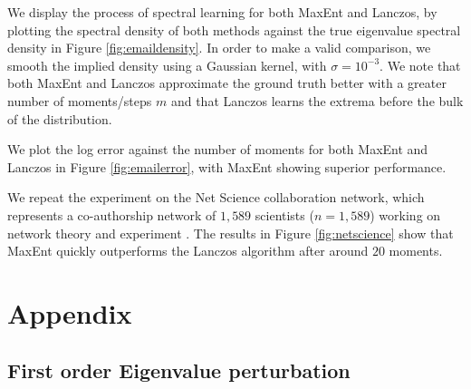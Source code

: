 \documentclass[letterpaper]{article} %
\begin{document}
\label{smoothinglancsoz}
We display the process of spectral learning for both MaxEnt and Lanczos, by plotting the spectral density of both methods against the true eigenvalue spectral density in Figure \ref{fig:emaildensity}. In order to make a valid comparison, we smooth the implied density using a Gaussian kernel, with $\sigma = 10^{-3}$. We note that both MaxEnt and Lanczos approximate the ground truth better with a greater number of moments/steps $m$ and that Lanczos learns the extrema before the bulk of the distribution.


We plot the log error against the number of moments for both MaxEnt and Lanczos in Figure \ref{fig:emailerror}, with MaxEnt showing superior performance.



We repeat the experiment on the Net Science collaboration network, which represents a co-authorship network of $1,589$ scientists ($n = 1,589$) working on network theory and experiment \citep{newman2006finding}. The results in Figure \ref{fig:netscience} show that MaxEnt quickly outperforms the Lanczos algorithm after around $20$ moments.

\section{Appendix}
\subsection{First order Eigenvalue perturbation}
\end{document}
